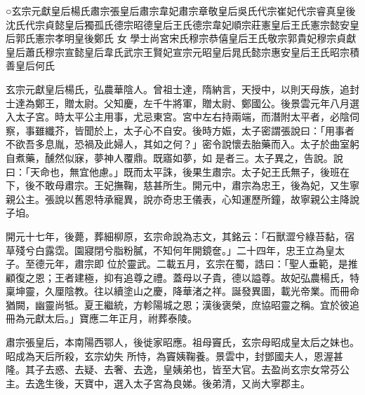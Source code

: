
\begin{pinyinscope}

 ○玄宗元獻皇后楊氏肅宗張皇后肅宗韋妃肅宗章敬皇后吳氏代宗崔妃代宗睿真皇後沈氏代宗貞懿皇后獨孤氏德宗昭德皇后王氏德宗韋妃順宗莊憲皇后王氏憲宗懿安皇后郭氏憲宗孝明皇後鄭氏
 女
 學士尚宮宋氏穆宗恭僖皇后王氏敬宗郭貴妃穆宗貞獻皇后蕭氏穆宗宣懿皇后韋氏武宗王賢妃宣宗元昭皇后晁氏懿宗惠安皇后王氏昭宗積善皇后何氏



 玄宗元獻皇后楊氏，弘農華陰人。曾祖士達，隋納言，天授中，以則天母族，追封士達為鄭王，贈太尉。父知慶，左千牛將軍，贈太尉、鄭國公。後景雲元年八月選入太子宮。時太平公主用事，尤忌東宮。宮中左右持兩端，而潛附太平者，必陰伺察，事雖纖芥，皆聞於上，太子心不自安。後時方娠，太子密謂張說曰：「用事者不欲吾多息胤，恐禍及此婦人，其如之何？」密令說懷去胎藥而入。太子於曲室躬自煮藥，醺然似寐，夢神人覆鼎。既寤如夢，如
 是者三。太子異之，告說。說曰：「天命也，無宜他慮。」既而太平誅，後果生肅宗。太子妃王氏無子，後班在下，後不敢母肅宗。王妃撫鞠，慈甚所生。開元中，肅宗為忠王，後為妃，又生寧親公主。張說以舊恩特承寵異，說亦奇忠王儀表，心知運歷所鐘，故寧親公主降說子垍。



 開元十七年，後薨，葬細柳原，玄宗命說為志文，其銘云：「石獸澀兮綠苔黏，宿草殘兮白露霑。園寢閉兮脂粉膩，不知何年開鏡奩。」二十四年，忠王立為皇太子。至德元年，肅宗即
 位於靈武。二載五月，玄宗在蜀，誥曰：「聖人垂範，是推顧復之恩；王者建極，抑有追尊之禮。蓋母以子貴，德以謚尊。故妃弘農楊氏，特稟坤靈，久厘陰教。往以續塗山之慶，降華渚之祥。誕發異圖，載光帝業。而冊命猶闕，幽靈尚牴。夏王繼統，方軫陽城之恩；漢後褒榮，庶協昭靈之稱。宜於彼追冊為元獻太后。」寶應二年正月，祔葬泰陵。



 肅宗張皇后，本南陽西鄂人，後徙家昭應。祖母竇氏，玄宗母昭成皇太后之妹也。昭成為天后所殺，玄宗幼失
 所恃，為竇姨鞠養。景雲中，封鄧國夫人，恩渥甚隆。其子去惑、去疑、去奢、去逸，皇姨弟也，皆至大官。去盈尚玄宗女常芬公主。去逸生後，天寶中，選入太子宮為良娣。後弟清，又尚大寧郡主。




\end{pinyinscope}
